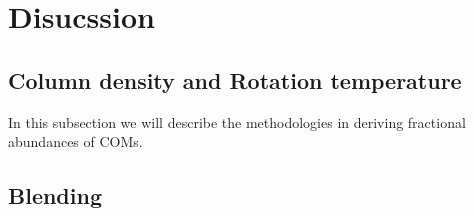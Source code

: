 \section{Disucssion}
\subsection{Column density and Rotation temperature}

In this subsection we will describe the methodologies in deriving fractional abundances
of COMs.

\subsection{Blending}